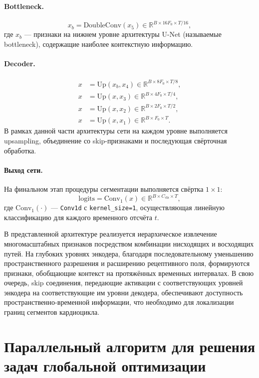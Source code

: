 \documentclass[11pt, oneside, a4paper]{article}
\begin{document}
\paragraph{Bottleneck.}
\[
x_b = \text{DoubleConv}(x_5) \in \mathbb{R}^{B \times 16F_0 \times T/16},
\]
где $x_b$ --- признаки на нижнем уровне архитектуры U-Net (называемые bottleneck), содержащие наиболее контекстную информацию.

\paragraph{Decoder.}
\begin{align*}
x &= \text{Up}(x_b, x_4) \in \mathbb{R}^{B \times 8F_0 \times T/8},\\
x &= \text{Up}(x, x_3) \in \mathbb{R}^{B \times 4F_0 \times T/4},\\
x &= \text{Up}(x, x_2) \in \mathbb{R}^{B \times 2F_0 \times T/2},\\
x &= \text{Up}(x, x_1) \in \mathbb{R}^{B \times F_0 \times T}.
\end{align*}
В рамках данной части архитектуры сети на каждом уровне выполняется upsampling, объединение со skip-признаками и последующая свёрточная обработка.

\paragraph{Выход сети.}
На финальном этап процедуры сегментации выполняется свёртка $1\times1$:
\[
\text{logits} = \text{Conv}_{1}(x) \in \mathbb{R}^{B \times C_{\text{cls}} \times T},
\]
где $\text{Conv}_{1}(\cdot)$ --- \texttt{Conv1d} с \texttt{kernel\_size=1}, осуществляющая линейную классификацию для каждого временного отсчёта $t$.

В представленной архитектуре реализуется иерархическое извлечение многомасштабных признаков посредством комбинации нисходящих и восходящих путей. На глубоких уровнях энкодера, благодаря последовательному уменьшению пространственного разрешения и расширению рецептивного поля, формируются признаки, обобщающие контекст на протяжённых временных интервалах. В свою очередь, skip соединения, передающие активации с соответствующих уровней энкодера на соответствующие им уровни декодера, обеспечивают доступность пространственно-временной информации, что необходимо для локализации границ сегментов кардиоцикла.

\label{sec-problem}



\section{Параллельный алгоритм для решения задач глобальной оптимизации} \label{sec-PGSA}
\end{document}
